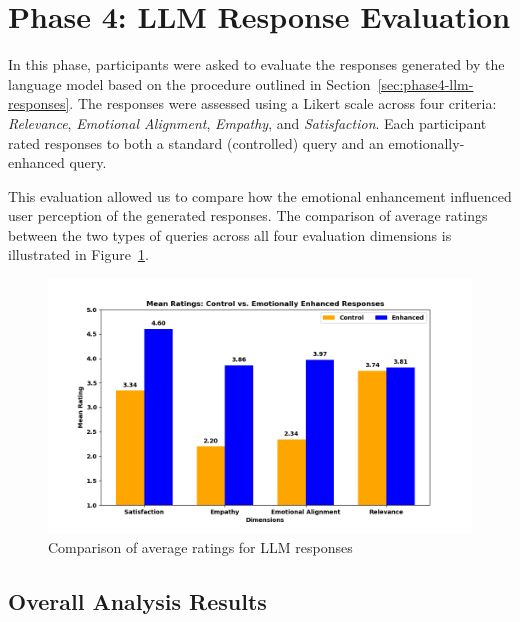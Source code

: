 \section{Phase 4: LLM Response Evaluation}
\label{sec:phase4-llm-evaluation}

In this phase, participants were asked to evaluate the responses generated by the language model based on the procedure outlined in Section~\ref{sec:phase4-llm-responses}. The responses were assessed using a Likert scale across four criteria: \textit{Relevance}, \textit{Emotional Alignment}, \textit{Empathy}, and \textit{Satisfaction}. Each participant rated responses to both a standard (controlled) query and an emotionally-enhanced query.

This evaluation allowed us to compare how the emotional enhancement influenced user perception of the generated responses. The comparison of average ratings between the two types of queries across all four evaluation dimensions is illustrated in Figure~\ref{fig:llm_eval_comparison}.

\begin{figure}[h]
    \centering
    \includegraphics[width=1\textwidth]{img/chapter_04/llm/mean_ratings_comparison.png}
    \caption{Comparison of average ratings for LLM responses}
    \label{fig:llm_eval_comparison}
\end{figure}

\subsection*{Overall Analysis Results}

